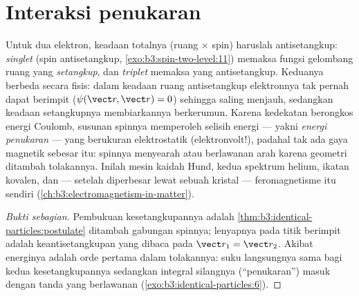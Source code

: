 \section{Interaksi penukaran}

\begin{proposition}\label{prop:b3:identical-particles:exchange-force}
Untuk dua elektron, keadaan totalnya (ruang $\times$ spin) haruslah
antisetangkup: \emph{singlet} (spin antisetangkup,
\cref{exo:b3:spin-two-level:11}) memaksa fungsi gelombang ruang yang
\emph{setangkup}, dan \emph{triplet} memaksa yang antisetangkup.
Keduanya berbeda secara fisis: dalam keadaan ruang antisetangkup
elektronnya tak pernah dapat berimpit ($\psi(\vect r, \vect r) = 0$)
sehingga saling menjauh, sedangkan keadaan setangkupnya membiarkannya
berkerumun. Karena kedekatan berongkos energi Coulomb, susunan spinnya
memperoleh selisih energi --- yakni \emph{energi penukaran} --- yang
berukuran elektrostatik (elektronvolt!), padahal tak ada gaya magnetik
sebesar itu: spinnya menyearah atau berlawanan arah karena geometri
ditambah tolakannya. Inilah mesin kaidah Hund, kedua spektrum helium,
ikatan kovalen, dan --- setelah diperbesar lewat sebuah kristal ---
feromagnetisme itu sendiri
(\cref{ch:b3:electromagnetism-in-matter}).
\end{proposition}

\begin{proof}[Bukti sebagian]
Pembukuan kesetangkupannya adalah
\cref{thm:b3:identical-particles:postulate} ditambah gabungan spinnya;
lenyapnya pada titik berimpit adalah keantisetangkupan yang dibaca pada
$\vect r_1 = \vect r_2$. Akibat energinya adalah  orde
pertama dalam tolakannya: suku langsungnya sama bagi kedua
kesetangkupannya sedangkan integral silangnya (``penukaran'') masuk
dengan tanda yang berlawanan (\cref{exo:b3:identical-particles:6}).
\end{proof}

